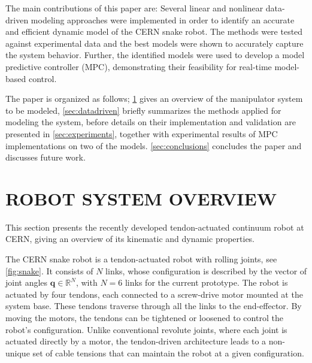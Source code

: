 \documentclass[../main.tex]{subfiles}
\begin{document}
The main contributions of this paper are: Several linear and nonlinear data-driven modeling approaches were implemented in order to identify an accurate and efficient dynamic model of the CERN snake robot. The methods were tested against experimental data and the best models were shown to accurately capture the system behavior. Further, the identified models were used to develop a model predictive controller (MPC), demonstrating their feasibility for real-time model-based control.


The paper is organized as follows; \cref{sec:system} gives an overview of the manipulator system to be modeled, \cref{sec:datadriven} briefly summarizes the methods applied for modeling the system, before details on their implementation and validation are presented in \cref{sec:experiments}, together with experimental results of MPC implementations on two of the models. \cref{sec:conclusions} concludes the paper and discusses future work.

\section{ROBOT SYSTEM OVERVIEW}
\label{sec:system}
This section presents the recently developed tendon-actuated continuum robot at CERN, giving an overview of its kinematic and dynamic properties.

The CERN snake robot is a tendon-actuated robot with rolling joints, see \cref{fig:snake}. It consists of $N$ links, whose configuration is described by the vector of joint angles $\bm{q} \in \mathbb{R}^N$, with $N=6$ links for the current prototype. The robot is actuated by four tendons, each connected to a screw-drive motor mounted at the system base.  These tendons traverse through all the links to the end-effector. By moving the motors, the tendons can be tightened or loosened to control the robot’s configuration. Unlike conventional revolute joints, where each joint is actuated directly by a motor, the tendon-driven architecture leads to a non-unique set of cable tensions that can maintain the robot at a given configuration.
\end{document}
